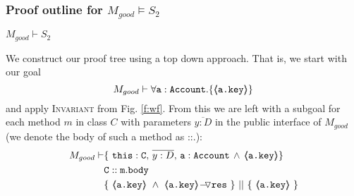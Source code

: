  \subsubsection{Proof outline for $M_{good} \models S_2$}

\newcommand{\SPT}{~ \strut \hspace{.6cm}}

\begin{lemma}
\label{lemma:exampleKeyProtect}
$M_{good} \vdash S_2$
\end{lemma}
\begin{proofO}
We construct our proof tree using a top down approach.  That is, we start with our goal
$$M_{good} \vdash \forall {\mbox{\normalfont{\texttt{a}}}:\mbox{\normalfont{\texttt{Account}}}}.{{\{}}{\langle\!\!\langle \mbox{\normalfont{\texttt{\mbox{\normalfont{\texttt{a.key}}}}}} \rangle\!\!\rangle}{{\}}}$$
and apply  \textsc{Invariant} from Fig. \ref{f:wf}.
From this we are left with a subgoal for each method $m$ in  class $C$ with parameters $\overline{y:D}$ in the public interface of $M_{good}$ (we denote the body of such a method as ::.):
\small
\begin{align*}
M_{good} \vdash
		& \{ \ \prg{this}:\prg{C},\, \overline{y:D},\, \prg{a}:\prg{Account}\, \wedge\,
		   {\inside{\prg{a.key}}}\} \\
		& \prg{C}::\prg{m}.\prg{body}\ \\
		& \{\ {\inside{\prg{a.key}}}\ \wedge\ {\PushASLong {\prg{res}} {\inside{\prg{a.key}}}}\ \}\ ||\ \{\ {\inside{\prg{a.key}}} \ 			\} 
\end{align*}
\normalsize
{}


\end{proofO}
